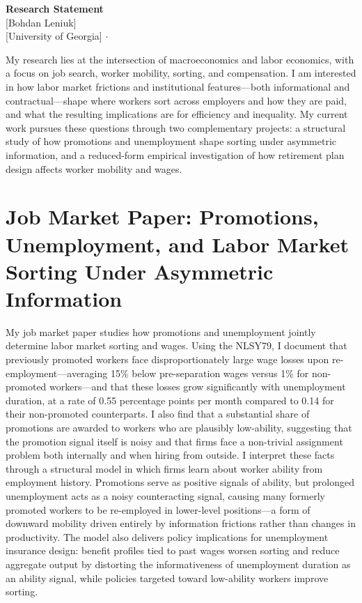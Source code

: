 \documentclass[12pt]{article}
\begin{document}
\begin{center}
    {\LARGE \textbf{Research Statement}} \\[0.8em]
    {\large [Bohdan Leniuk]} \\[0.3em]
    {\normalsize [University of Georgia] \quad $\cdot$ }
\end{center}

\vspace{1.5em}

My research lies at the intersection of macroeconomics and labor economics,
with a focus on job search, worker mobility, sorting, and compensation.
I am interested in how labor market frictions and institutional features---both
informational and contractual---shape where workers sort across employers and
how they are paid, and what the resulting implications are for efficiency and
inequality.
My current work pursues these questions through two complementary projects:
a structural study of how promotions and unemployment shape sorting under
asymmetric information, and a reduced-form empirical investigation of how
retirement plan design affects worker mobility and wages.

\section{Job Market Paper: Promotions, Unemployment, and Labor Market Sorting Under Asymmetric Information}

My job market paper studies how promotions and unemployment jointly determine
labor market sorting and wages.
Using the NLSY79, I document that previously promoted workers face
disproportionately large wage losses upon re-employment---averaging 15\%
below pre-separation wages versus 1\% for non-promoted workers---and that
these losses grow significantly with unemployment duration, at a rate of
0.55 percentage points per month compared to 0.14 for their non-promoted
counterparts.
I also find that a substantial share of promotions are awarded to workers who
are plausibly low-ability, suggesting that the promotion signal itself is noisy
and that firms face a non-trivial assignment problem both internally and when
hiring from outside.
I interpret these facts through a structural model in which firms learn about
worker ability from employment history.
Promotions serve as positive signals of ability, but prolonged unemployment
acts as a noisy counteracting signal, causing many formerly promoted workers
to be re-employed in lower-level positions---a form of downward mobility
driven entirely by information frictions rather than changes in productivity.
The model also delivers policy implications for unemployment insurance design:
benefit profiles tied to past wages worsen sorting and reduce aggregate output
by distorting the informativeness of unemployment duration as an ability
signal, while policies targeted toward low-ability workers improve sorting.
\end{document}
